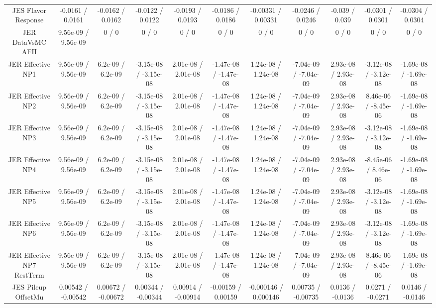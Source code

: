 \begin{table}[htbp]
\begin{center}
\begin{tabular}{|c|c|c|c|c|c|c|c|c|c|c|}
  JES Flavor Response & -0.0161 / 0.0161 & -0.0162 / 0.0162 & -0.0122 / 0.0122 & -0.0193 / 0.0193 & -0.0186 / 0.0186 & -0.00331 / 0.00331 & -0.0246 / 0.0246 & -0.039 / 0.039 & -0.0301 / 0.0301 & -0.0304 / 0.0304 \\ 
  JER DataVsMC AFII & 9.56e-09 / 9.56e-09 & 0 / 0 & 0 / 0 & 0 / 0 & 0 / 0 & 0 / 0 & 0 / 0 & 0 / 0 & 0 / 0 & 0 / 0 \\ 
  JER Effective NP1 & 9.56e-09 / 9.56e-09 & 6.2e-09 / 6.2e-09 & -3.15e-08 / -3.15e-08 & 2.01e-08 / 2.01e-08 & -1.47e-08 / -1.47e-08 & 1.24e-08 / 1.24e-08 & -7.04e-09 / -7.04e-09 & 2.93e-08 / 2.93e-08 & -3.12e-08 / -3.12e-08 & -1.69e-08 / -1.69e-08 \\ 
  JER Effective NP2 & 9.56e-09 / 9.56e-09 & 6.2e-09 / 6.2e-09 & -3.15e-08 / -3.15e-08 & 2.01e-08 / 2.01e-08 & -1.47e-08 / -1.47e-08 & 1.24e-08 / 1.24e-08 & -7.04e-09 / -7.04e-09 & 2.93e-08 / 2.93e-08 & 8.46e-06 / -8.45e-06 & -1.69e-08 / -1.69e-08 \\ 
  JER Effective NP3 & 9.56e-09 / 9.56e-09 & 6.2e-09 / 6.2e-09 & -3.15e-08 / -3.15e-08 & 2.01e-08 / 2.01e-08 & -1.47e-08 / -1.47e-08 & 1.24e-08 / 1.24e-08 & -7.04e-09 / -7.04e-09 & 2.93e-08 / 2.93e-08 & -3.12e-08 / -3.12e-08 & -1.69e-08 / -1.69e-08 \\ 
  JER Effective NP4 & 9.56e-09 / 9.56e-09 & 6.2e-09 / 6.2e-09 & -3.15e-08 / -3.15e-08 & 2.01e-08 / 2.01e-08 & -1.47e-08 / -1.47e-08 & 1.24e-08 / 1.24e-08 & -7.04e-09 / -7.04e-09 & 2.93e-08 / 2.93e-08 & -8.45e-06 / 8.46e-06 & -1.69e-08 / -1.69e-08 \\ 
  JER Effective NP5 & 9.56e-09 / 9.56e-09 & 6.2e-09 / 6.2e-09 & -3.15e-08 / -3.15e-08 & 2.01e-08 / 2.01e-08 & -1.47e-08 / -1.47e-08 & 1.24e-08 / 1.24e-08 & -7.04e-09 / -7.04e-09 & 2.93e-08 / 2.93e-08 & -3.12e-08 / -3.12e-08 & -1.69e-08 / -1.69e-08 \\ 
  JER Effective NP6 & 9.56e-09 / 9.56e-09 & 6.2e-09 / 6.2e-09 & -3.15e-08 / -3.15e-08 & 2.01e-08 / 2.01e-08 & -1.47e-08 / -1.47e-08 & 1.24e-08 / 1.24e-08 & -7.04e-09 / -7.04e-09 & 2.93e-08 / 2.93e-08 & -3.12e-08 / -3.12e-08 & -1.69e-08 / -1.69e-08 \\ 
  JER Effective NP7 RestTerm & 9.56e-09 / 9.56e-09 & 6.2e-09 / 6.2e-09 & -3.15e-08 / -3.15e-08 & 2.01e-08 / 2.01e-08 & -1.47e-08 / -1.47e-08 & 1.24e-08 / 1.24e-08 & -7.04e-09 / -7.04e-09 & 2.93e-08 / 2.93e-08 & 8.46e-06 / -8.45e-06 & -1.69e-08 / -1.69e-08 \\ 
  JES Pileup OffsetMu & 0.00542 / -0.00542 & 0.00672 / -0.00672 & 0.00344 / -0.00344 & 0.00914 / -0.00914 & -0.00159 / 0.00159 & -0.000146 / 0.000146 & 0.00735 / -0.00735 & 0.0136 / -0.0136 & 0.0271 / -0.0271 & 0.0146 / -0.0146 \\ 

\end{tabular}
\end{center}
\end{table}
